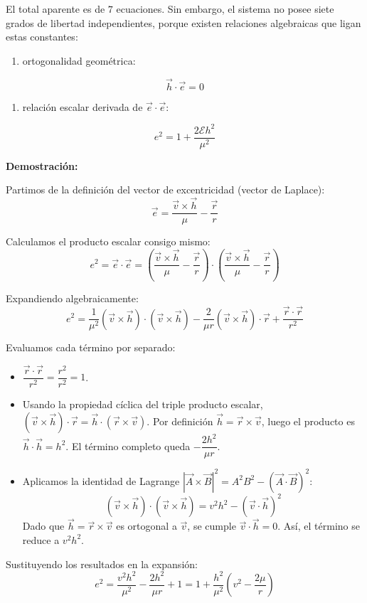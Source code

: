El total aparente es de \(7\) ecuaciones. Sin embargo, el sistema no posee siete grados de libertad independientes, porque existen relaciones algebraicas que ligan estas constantes:
\begin{enumerate}
    \item ortogonalidad geométrica:
\end{enumerate}
\[
\vec{h} \cdot \vec{e} = 0
\]
\begin{enumerate}[resume]
    \item relación escalar derivada de \(\vec{e} \cdot \vec{e}\):
\end{enumerate}

$$e^2 = 1 + \frac{2\mathcal{E}h^2}{\mu^2}$$

\textbf{Demostración:}

Partimos de la definición del vector de excentricidad (vector de Laplace):
$$\vec{e} = \frac{\vec{v} \times \vec{h}}{\mu} - \frac{\vec{r}}{r}$$

Calculamos el producto escalar consigo mismo:
$$e^2 = \vec{e} \cdot \vec{e} = \left( \frac{\vec{v} \times \vec{h}}{\mu} - \frac{\vec{r}}{r} \right) \cdot \left( \frac{\vec{v} \times \vec{h}}{\mu} - \frac{\vec{r}}{r} \right)$$

Expandiendo algebraicamente:
$$e^2 = \frac{1}{\mu^2}(\vec{v} \times \vec{h}) \cdot (\vec{v} \times \vec{h}) - \frac{2}{\mu r}(\vec{v} \times \vec{h}) \cdot \vec{r} + \frac{\vec{r} \cdot \vec{r}}{r^2}$$

Evaluamos cada término por separado:
\begin{itemize}
	\item $\dfrac{\vec{r} \cdot \vec{r}}{r^2} = \dfrac{r^2}{r^2} = 1$.
	\item Usando la propiedad cíclica del triple producto escalar, $(\vec{v} \times \vec{h}) \cdot \vec{r} = \vec{h} \cdot (\vec{r} \times \vec{v})$. Por definición $\vec{h} = \vec{r} \times \vec{v}$, luego el producto es $\vec{h} \cdot \vec{h} = h^2$. El término completo queda $-\dfrac{2h^2}{\mu r}$.
	\item Aplicamos la identidad de Lagrange $|\vec{A} \times \vec{B}|^2 = A^2B^2 - (\vec{A}\cdot\vec{B})^2$:
   $$(\vec{v} \times \vec{h}) \cdot (\vec{v} \times \vec{h}) = v^2 h^2 - (\vec{v} \cdot \vec{h})^2$$
   Dado que $\vec{h} = \vec{r} \times \vec{v}$ es ortogonal a $\vec{v}$, se cumple $\vec{v} \cdot \vec{h} = 0$. Así, el término se reduce a $v^2 h^2$.
\end{itemize}

Sustituyendo los resultados en la expansión:
$$e^2 = \frac{v^2 h^2}{\mu^2} - \frac{2 h^2}{\mu r} + 1 = 1 + \frac{h^2}{\mu^2}\left( v^2 - \frac{2\mu}{r} \right)$$

